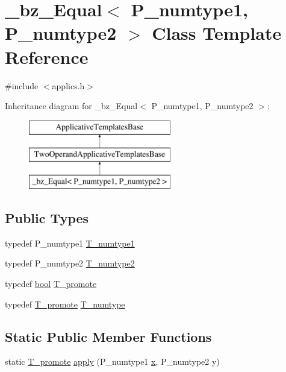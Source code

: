 \hypertarget{class__bz__Equal}{}\section{\+\_\+bz\+\_\+\+Equal$<$ P\+\_\+numtype1, P\+\_\+numtype2 $>$ Class Template Reference}
\label{class__bz__Equal}


{\ttfamily \#include $<$applics.\+h$>$}

Inheritance diagram for \+\_\+bz\+\_\+\+Equal$<$ P\+\_\+numtype1, P\+\_\+numtype2 $>$\+:\begin{figure}[H]
\begin{center}
\leavevmode
\includegraphics[height=3.000000cm]{class__bz__Equal}
\end{center}
\end{figure}
\subsection*{Public Types}
\begin{DoxyCompactItemize}
\item 
typedef P\+\_\+numtype1 \hyperlink{class__bz__Equal_a35f064580355c9d55081ce1c2f92dacd}{T\+\_\+numtype1}
\item 
typedef P\+\_\+numtype2 \hyperlink{class__bz__Equal_a26fe90ebaa67c328304b7dc1359a3673}{T\+\_\+numtype2}
\item 
typedef \hyperlink{compiler_8h_abb452686968e48b67397da5f97445f5b}{bool} \hyperlink{class__bz__Equal_aeba9102c0e4e3907384094171fe1a6da}{T\+\_\+promote}
\item 
typedef \hyperlink{class__bz__Equal_aeba9102c0e4e3907384094171fe1a6da}{T\+\_\+promote} \hyperlink{class__bz__Equal_a2084ac2a57dc930cf39f71ad99a96dfc}{T\+\_\+numtype}
\end{DoxyCompactItemize}
\subsection*{Static Public Member Functions}
\begin{DoxyCompactItemize}
\item 
static \hyperlink{class__bz__Equal_aeba9102c0e4e3907384094171fe1a6da}{T\+\_\+promote} \hyperlink{class__bz__Equal_aaef5a1adfffcbc8933aedac51b1bcff1}{apply} (P\+\_\+numtype1 \hyperlink{vecnorm1_8cc_ac73eed9e41ec09d58f112f06c2d6cb63}{x}, P\+\_\+numtype2 y)
\end{DoxyCompactItemize}


